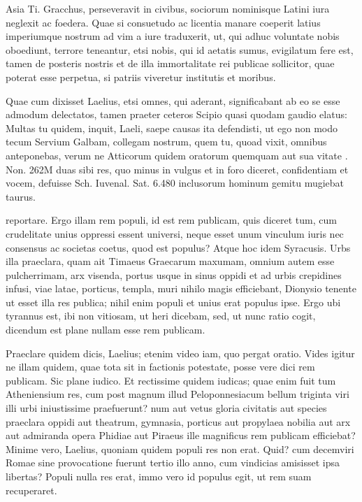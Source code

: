  Asia Ti. Gracchus, perseveravit in civibus, sociorum nominisque Latini iura neglexit ac foedera. Quae si consuetudo ac licentia manare coeperit latius imperiumque nostrum ad vim a iure traduxerit, ut, qui adhuc voluntate nobis oboediunt, terrore teneantur, etsi nobis, qui id aetatis sumus, evigilatum fere est, tamen de posteris nostris et de illa immortalitate rei publicae sollicitor, quae poterat esse perpetua, si patriis viveretur institutis et moribus.

 Quae cum dixisset Laelius, etsi omnes, qui aderant, significabant ab eo se esse admodum delectatos, tamen praeter ceteros Scipio quasi quodam gaudio elatus: Multas tu quidem, inquit, Laeli, saepe causas ita defendisti, ut ego non modo tecum Servium Galbam, collegam nostrum, quem tu, quoad vixit, omnibus anteponebas, verum ne Atticorum quidem oratorum quemquam aut sua vitate . Non. 262M duas sibi res, quo minus in vulgus et in foro diceret, confidentiam et vocem, defuisse Sch. Iuvenal. Sat. 6.480 inclusorum hominum gemitu mugiebat taurus.

 reportare. Ergo illam rem populi, id est rem publicam, quis diceret tum, cum crudelitate unius oppressi essent universi, neque esset unum vinculum iuris nec consensus ac societas coetus, quod est populus? Atque hoc idem Syracusis. Urbs illa praeclara, quam ait Timaeus Graecarum maxumam, omnium autem esse pulcherrimam, arx visenda, portus usque in sinus oppidi et ad urbis crepidines infusi, viae latae, porticus, templa, muri nihilo magis efficiebant, Dionysio tenente ut esset illa res publica; nihil enim populi et unius erat populus ipse. Ergo ubi tyrannus est, ibi non vitiosam, ut heri dicebam, sed, ut nunc ratio cogit, dicendum est plane nullam esse rem publicam.

 Praeclare quidem dicis, Laelius; etenim video iam, quo pergat oratio. Vides igitur ne illam quidem, quae tota sit in factionis potestate, posse vere dici rem publicam. Sic plane iudico. Et rectissime quidem iudicas; quae enim fuit tum Atheniensium res, cum post magnum illud Peloponnesiacum bellum triginta viri illi urbi iniustissime praefuerunt? num aut vetus gloria civitatis aut species praeclara oppidi aut theatrum, gymnasia, porticus aut propylaea nobilia aut arx aut admiranda opera Phidiae aut Piraeus ille magnificus rem publicam efficiebat? Minime vero, Laelius, quoniam quidem populi res non erat. Quid? cum decemviri Romae sine provocatione fuerunt tertio illo anno, cum vindicias amisisset ipsa libertas? Populi nulla res erat, immo vero id populus egit, ut rem suam recuperaret.

